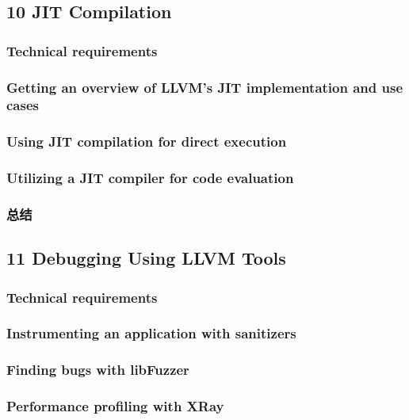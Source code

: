\documentclass[11pt,a4paper,UTF8]{ctexart}
\begin{document}
	\subsection{10 JIT Compilation}
		\subsubsection{Technical requirements}
		\subsubsection{Getting an overview of LLVM's JIT implementation and use cases}
		\subsubsection{Using JIT compilation for direct execution}
		\subsubsection{Utilizing a JIT compiler for code evaluation}
		\subsubsection{总结}
	\subsection{11 Debugging Using LLVM Tools}
		\subsubsection{Technical requirements}
		\subsubsection{Instrumenting an application with sanitizers}
		\subsubsection{Finding bugs with libFuzzer}
		\subsubsection{Performance profiling with XRay}
\end{document}

